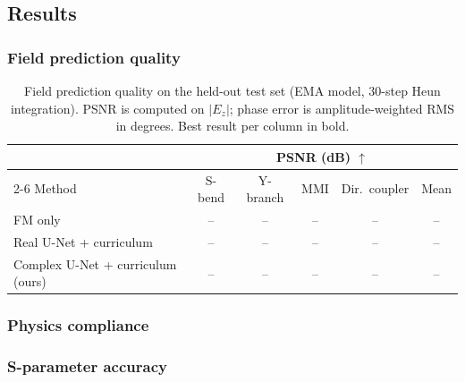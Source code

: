 \subsection{Results}


\subsubsection{Field prediction quality}


\begin{table}[t]
\centering
\caption{Field prediction quality on the held-out test set (EMA model, 30-step Heun integration). PSNR is computed on
$|E_z|$; phase error is amplitude-weighted RMS in degrees. Best result per column in bold.}
\label{tab:field_quality}
\begin{tabular}{lccccc}
\hline\hline
 & \multicolumn{5}{c}{PSNR (dB) $\uparrow$} \\
\cline{2-6}
Method & S-bend & Y-branch & MMI & Dir.\ coupler & Mean \\
\hline
FM only           & -- & -- & -- & -- & -- \\
Real U-Net + curriculum & -- & -- & -- & -- & -- \\
Complex U-Net + curriculum (ours) & -- & -- & -- & -- & -- \\
\hline\hline
\end{tabular}
\end{table}

\subsubsection{Physics compliance}


\subsubsection{S-parameter accuracy}

